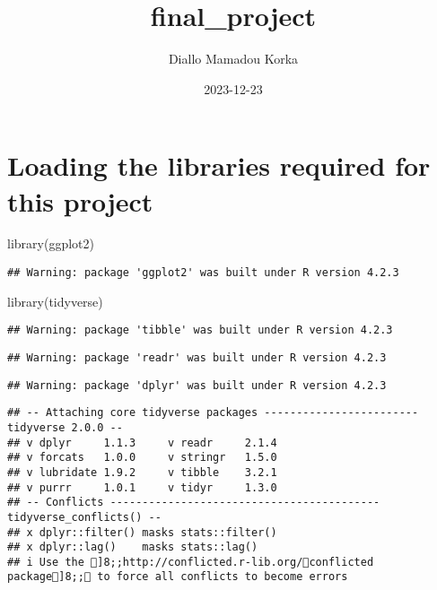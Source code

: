 \documentclass[
]{article}
\title{final\_project}
\author{Diallo Mamadou Korka}
\date{2023-12-23}
\newenvironment{Shaded}{\begin{snugshade}}{\end{snugshade}}
\newcommand{\FunctionTok}[1]{\textcolor[rgb]{0.00,0.00,0.00}{#1}}
\newcommand{\NormalTok}[1]{#1}
\begin{document}
\maketitle

\hypertarget{loading-the-libraries-required-for-this-project}{%
\section{Loading the libraries required for this
project}\label{loading-the-libraries-required-for-this-project}}

\begin{Shaded}
\begin{Highlighting}[]
\FunctionTok{library}\NormalTok{(ggplot2)}
\end{Highlighting}
\end{Shaded}

\begin{verbatim}
## Warning: package 'ggplot2' was built under R version 4.2.3
\end{verbatim}

\begin{Shaded}
\begin{Highlighting}[]
\FunctionTok{library}\NormalTok{(tidyverse)}
\end{Highlighting}
\end{Shaded}

\begin{verbatim}
## Warning: package 'tibble' was built under R version 4.2.3
\end{verbatim}

\begin{verbatim}
## Warning: package 'readr' was built under R version 4.2.3
\end{verbatim}

\begin{verbatim}
## Warning: package 'dplyr' was built under R version 4.2.3
\end{verbatim}

\begin{verbatim}
## -- Attaching core tidyverse packages ------------------------ tidyverse 2.0.0 --
## v dplyr     1.1.3     v readr     2.1.4
## v forcats   1.0.0     v stringr   1.5.0
## v lubridate 1.9.2     v tibble    3.2.1
## v purrr     1.0.1     v tidyr     1.3.0
## -- Conflicts ------------------------------------------ tidyverse_conflicts() --
## x dplyr::filter() masks stats::filter()
## x dplyr::lag()    masks stats::lag()
## i Use the ]8;;http://conflicted.r-lib.org/conflicted package]8;; to force all conflicts to become errors
\end{verbatim}
\end{document}
